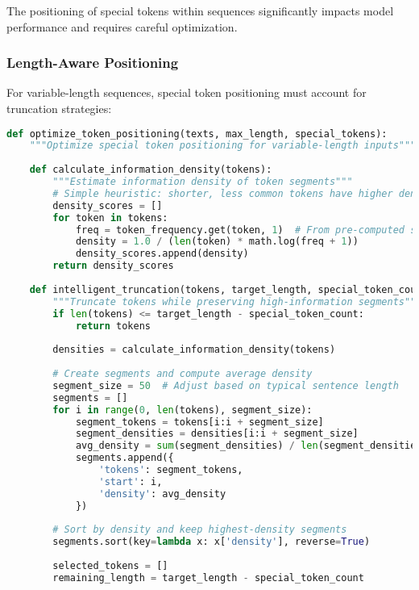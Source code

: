 The positioning of special tokens within sequences significantly impacts model performance and requires careful optimization.

\subsubsection{Length-Aware Positioning}

For variable-length sequences, special token positioning must account for truncation strategies:

\begin{lstlisting}[language=Python, caption=Length-aware special token positioning]
def optimize_token_positioning(texts, max_length, special_tokens):
    """Optimize special token positioning for variable-length inputs"""
    
    def calculate_information_density(tokens):
        """Estimate information density of token segments"""
        # Simple heuristic: shorter, less common tokens have higher density
        density_scores = []
        for token in tokens:
            freq = token_frequency.get(token, 1)  # From pre-computed statistics
            density = 1.0 / (len(token) * math.log(freq + 1))
            density_scores.append(density)
        return density_scores
    
    def intelligent_truncation(tokens, target_length, special_token_count):
        """Truncate tokens while preserving high-information segments"""
        if len(tokens) <= target_length - special_token_count:
            return tokens
        
        densities = calculate_information_density(tokens)
        
        # Create segments and compute average density
        segment_size = 50  # Adjust based on typical sentence length
        segments = []
        for i in range(0, len(tokens), segment_size):
            segment_tokens = tokens[i:i + segment_size]
            segment_densities = densities[i:i + segment_size]
            avg_density = sum(segment_densities) / len(segment_densities)
            segments.append({
                'tokens': segment_tokens,
                'start': i,
                'density': avg_density
            })
        
        # Sort by density and keep highest-density segments
        segments.sort(key=lambda x: x['density'], reverse=True)
        
        selected_tokens = []
        remaining_length = target_length - special_token_count
        

\end{lstlisting}
